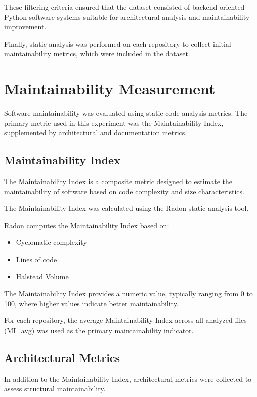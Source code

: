 These filtering criteria ensured that the dataset consisted of backend-oriented Python software systems suitable for architectural analysis and maintainability improvement.

Finally, static analysis was performed on each repository to collect initial maintainability metrics, which were included in the dataset.

\section{Maintainability Measurement}

Software maintainability was evaluated using static code analysis metrics. The primary metric used in this experiment was the Maintainability Index, supplemented by architectural and documentation metrics.

\subsection{Maintainability Index}

The Maintainability Index is a composite metric designed to estimate the maintainability of software based on code complexity and size characteristics.

The Maintainability Index was calculated using the Radon static analysis tool.

Radon computes the Maintainability Index based on:

\begin{itemize}
\item Cyclomatic complexity
\item Lines of code
\item Halstead Volume
\end{itemize}

The Maintainability Index provides a numeric value, typically ranging from 0 to 100, where higher values indicate better maintainability.

For each repository, the average Maintainability Index across all analyzed files (MI\_avg) was used as the primary maintainability indicator.

\subsection{Architectural Metrics}

In addition to the Maintainability Index, architectural metrics were collected to assess structural maintainability.

